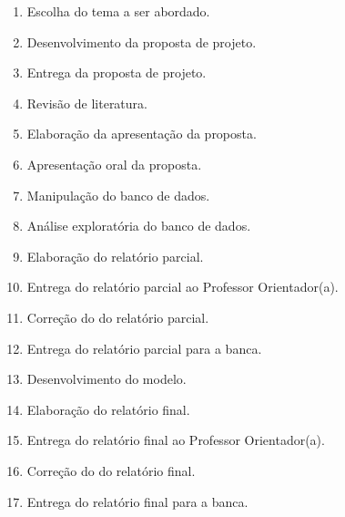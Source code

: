 \begin{multicols}{2}
\begin{enumerate}
	\item \label{etapa1} Escolha do tema a ser abordado.
	\item \label{etapa2} Desenvolvimento da proposta de projeto.
	\item \label{etapa3} Entrega da proposta de projeto.
	\item \label{etapa4} Revisão de literatura.
	\item \label{etapa5} Elaboração da apresentação da proposta.
	\item \label{etapa6}  Apresentação oral da proposta.
	\item \label{etapa7} Manipulação do banco de dados.
	\item \label{etapa8}  Análise exploratória do banco de dados.
	\item \label{etapa9} Elaboração do relatório parcial.
	\item \label{etapa10} Entrega do relatório parcial ao Professor Orientador(a).
	\item \label{etapa11} Correção do do relatório parcial.
	\item \label{etapa12} Entrega do relatório parcial para a banca.
	\item \label{etapa13} Desenvolvimento do modelo.
        \item \label{etapa14} Elaboração do relatório final.
	\item \label{etapa15} Entrega do relatório final ao Professor Orientador(a).
	\item \label{etapa16} Correção do do relatório final.
	\item \label{etapa17} Entrega do relatório final para a banca.
\end{enumerate}
\end{multicols}


